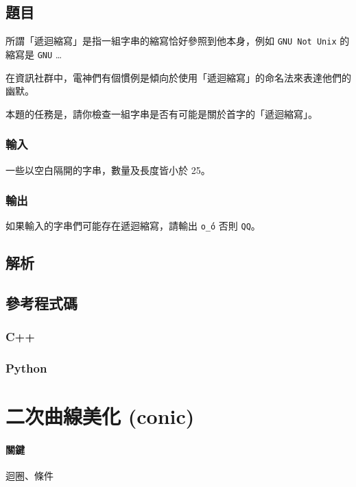 \documentclass[a4paper,10pt]{article}
\begin{document}
\subsection{題目}

所謂「遞迴縮寫」是指一組字串的縮寫恰好參照到他本身，例如 \texttt{GNU Not Unix} 的縮寫是 \texttt{GNU} \dots

在資訊社群中，電神們有個慣例是傾向於使用「遞迴縮寫」的命名法來表達他們的幽默。

本題的任務是，請你檢查一組字串是否有可能是關於首字的「遞迴縮寫」。

\subsubsection{輸入}

一些以空白隔開的字串，數量及長度皆小於 25。

\subsubsection{輸出}

如果輸入的字串們可能存在遞迴縮寫，請輸出 \texttt{o\'\_\'o} 否則 \texttt{QQ}。

\subsection{解析}

\subsection{參考程式碼}

\subsubsection{C++}



\subsubsection{Python}



\section{二次曲線美化 (conic)}

\paragraph{關鍵} 迴圈、條件
\end{document}
